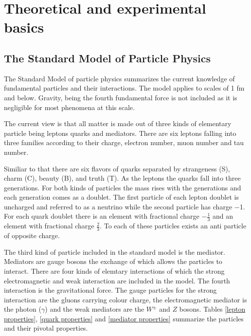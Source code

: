 \chapter{Theoretical and experimental basics}
\label{theory}

\section{The Standard Model of Particle Physics}

The Standard Model of particle physics summarizes the current knowledge of fundamental particles and their interactions. The model applies to scales of 1 fm and below. Gravity, being the fourth fundamental force is not included as it is negligible for most phenomena at this scale.

The current view is that all matter is made out of three kinds of elementary particle being leptons quarks and mediators.
There are six leptons falling into three families according to their charge, electron number, muon number and tau number. 

Similiar to that there are six flavors of quarks separated by strangeness (S), charm (C), beauty (B), and truth (T). As the leptons the quarks fall into three generations.
For both kinds of particles the mass rises with the generations and each generation comes as a doublet. The first particle of each lepton doublet is uncharged and referred to as a neutrino while the second particle has charge \num{-1}.
For each quark doublet there is an element with fractional charge $-\frac{1}{3}$ and an element with fractional charge $\frac{2}{3}$.
To each of these particles exists an anti particle of opposite charge.

The third kind of particle included in the standard model is the mediator. Mediators are gauge bosons the exchange of which allows the particles to interact. There are four kinds of elemtary interactions of which the strong electromagnetic and weak interaction are included in the model. The fourth interaction is the gravitational force.
The gauge particles for the strong interaction are the gluons carrying colour charge, the electromagnetic mediator is the photon ($\gamma$) and the weak mediators are the $W^{\pm}$ and $Z$ bosons.
Tables \ref{lepton properties}, \ref{quark properties} and \ref{mediator properties} summarize the particles and their pivotal properties.
\newpage


